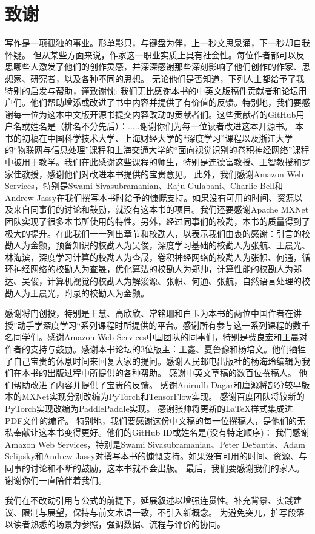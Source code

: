 \chapter*{ 致谢}
写作是一项孤独的事业。形单影只，与键盘为伴，上一秒文思泉涌，下一秒却自我怀疑。
但从某些方面来说，作家这一职业实质上具有社会性。每位作者都可以反思哪些人激发了他们的创作灵感，并深深感谢那些深刻影响了他们创作的作家、思想家、研究者，以及各种不同的思想。
无论他们是否知道，下列人士都给予了我特别的启发与帮助，谨致谢忱:
我们无比感谢本书的中英文版稿件贡献者和论坛用户们。他们帮助增添或改进了书中内容并提供了有价值的反馈。特别地，我们要感谢每一位为这本中文版开源书提交内容改动的贡献者们。这些贡献者的GitHub用户名或姓名是（排名不分先后）：.....谢谢你们为每一位读者改进这本开源书。
本书的初稿在中国科学技术大学、上海财经大学的“深度学习”课程以及浙江大学的“物联网与信息处理”课程和上海交通大学的“面向视觉识别的卷积神经网络”课程中被用于教学。我们在此感谢这些课程的师生，特别是连德富教授、王智教授和罗家佳教授，感谢他们对改进本书提供的宝贵意见。
此外，我们感谢Amazon Web Services，特别是Swami Sivasubramanian、Raju Gulabani、Charlie Bell和Andrew Jassy在我们撰写本书时给予的慷慨支持。如果没有可用的时间、资源以及来自同事们的讨论和鼓励，就没有这本书的项目。我们还要感谢Apache MXNet团队实现了很多本书所使用的特性。另外，经过同事们的校勘，本书的质量得到了极大的提升。在此我们一一列出章节和校勘人，以表示我们由衷的感谢：引言的校勘人为金颢，预备知识的校勘人为吴俊，深度学习基础的校勘人为张航、王晨光、林海滨，深度学习计算的校勘人为查晟，卷积神经网络的校勘人为张帜、何通，循环神经网络的校勘人为查晟，优化算法的校勘人为郑帅，计算性能的校勘人为郑达、吴俊，计算机视觉的校勘人为解浚源、张帜、何通、张航，自然语言处理的校勘人为王晨光，附录的校勘人为金颢。


感谢将门创投，特别是王慧、高欣欣、常铭珊和白玉为本书的两位中国作者在讲授”动手学深度学习“系列课程时所提供的平台。感谢所有参与这一系列课程的数千名同学们。感谢Amazon Web Services中国团队的同事们，特别是费良宏和王晨对作者的支持与鼓励。感谢本书论坛的3位版主：王鑫、夏鲁豫和杨培文。他们牺牲了自己宝贵的休息时间来回复大家的提问。感谢人民邮电出版社的杨海玲编辑为我们在本书的出版过程中所提供的各种帮助。
感谢中英文草稿的数百位撰稿人。
他们帮助改进了内容并提供了宝贵的反馈。
感谢Anirudh Dagar和唐源将部分较早版本的MXNet实现分别改编为PyTorch和TensorFlow实现。
感谢百度团队将较新的PyTorch实现改编为PaddlePaddle实现。
感谢张帅将更新的LaTeX样式集成进PDF文件的编译。
特别地，我们要感谢这份中文稿的每一位撰稿人，是他们的无私奉献让这本书变得更好。他们的GitHub ID或姓名是(没有特定顺序)：
我们感谢Amazon Web Services，特别是Swami Sivasubramanian、Peter DeSantis、Adam Selipsky和Andrew Jassy对撰写本书的慷慨支持。如果没有可用的时间、资源、与同事的讨论和不断的鼓励，这本书就不会出版。
最后，我们要感谢我们的家人。谢谢你们一直陪伴着我们。

\newpage

我们在不改动引用与公式的前提下，延展叙述以增强连贯性。补充背景、实践建议、限制与展望，保持与前文术语一致，不引入新概念。
为避免突兀，扩写段落以读者熟悉的场景为参照，强调数据、流程与评价的协同。
